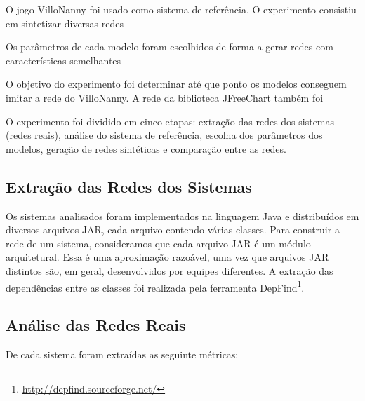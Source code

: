 \documentclass{acm_proc_article-sp}
\begin{document}
O jogo VilloNanny foi usado como sistema de referência. O experimento consistiu em sintetizar diversas redes 

Os parâmetros de cada modelo foram escolhidos de forma a gerar redes com características semelhantes

O objetivo do experimento foi determinar até que ponto os modelos conseguem imitar a rede do VilloNanny. A rede da biblioteca JFreeChart também foi 

O experimento foi dividido em cinco etapas: extração das redes dos sistemas (redes reais), análise do sistema de referência, escolha dos parâmetros dos modelos, geração de redes sintéticas e comparação entre as redes. 

\subsection{Extração das Redes dos Sistemas}

Os sistemas analisados foram implementados na linguagem Java e distribuídos em diversos arquivos JAR, cada arquivo contendo várias classes. Para construir a rede de um sistema, consideramos que cada arquivo JAR é um módulo arquitetural. Essa é uma aproximação razoável, uma vez que arquivos JAR distintos são, em geral, desenvolvidos por equipes diferentes. A extração das dependências entre as classes foi realizada pela ferramenta DepFind\footnote{\url{http://depfind.sourceforge.net/}}.


\subsection{Análise das Redes Reais}


De cada sistema foram extraídas as seguinte métricas:
\end{document}
